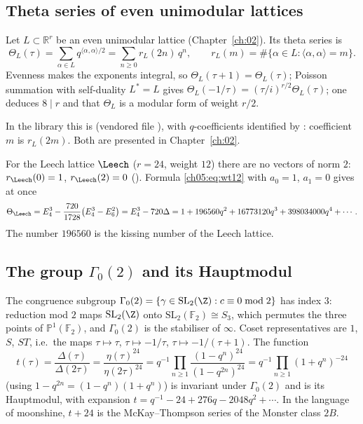 \subsection{Theta series of even unimodular lattices}\label{ch05:sec:thetabg}

Let $L\subset\mathbb R^r$ be an even unimodular lattice (Chapter~\ref{ch:02}). Its theta series is
\begin{equation*}
  \Theta_L(\tau) = \sum_{\alpha\in L} q^{\langle\alpha,\alpha\rangle/2}
  = \sum_{n\ge0} r_L(2n)\,q^n, \qquad r_L(m) = \#\{\alpha\in L : \langle\alpha,\alpha\rangle = m\}.
\end{equation*}
Evenness makes the exponents integral, so $\Theta_L(\tau+1) = \Theta_L(\tau)$; Poisson summation with
self-duality $L^* = L$ gives $\Theta_L(-1/\tau) = (\tau/i)^{r/2}\Theta_L(\tau)$; one deduces $8\mid r$
and that $\Theta_L$ is a modular form of weight $r/2$.
\begin{sloppypar}\noindent In the library this is
 (vendored file
), with $q$-coefficients identified by
: coefficient $m$ is $r_L(2m)$. Both are
presented in Chapter~\ref{ch:02}.\end{sloppypar}

For the Leech lattice $\Leech$ ($r = 24$, weight $12$) there are no vectors of norm $2$:
$r_\Leech(0) = 1$, $r_\Leech(2) = 0$ (). Formula \eqref{ch05:eq:wt12}
with $a_0 = 1$, $a_1 = 0$ gives at once
\begin{equation}\label{ch05:eq:leechtheta}
  \Theta_\Leech = E_4^3 - \frac{720}{1728}\bigl(E_4^3-E_6^2\bigr) = E_4^3 - 720\Delta
  = 1 + 196560q^2 + 16773120q^3 + 398034000q^4+\cdots.
\end{equation}
The number $196560$ is the kissing number of the Leech lattice.

\subsection{The group \texorpdfstring{$\Gamma_0(2)$}{Gamma0(2)} and its Hauptmodul}\label{ch05:sec:gamma02}

The congruence subgroup
$\Gamma_0(2) = \{\gamma\in\chfiveSL : c\equiv 0 \bmod 2\}$ has index $3$: reduction mod $2$ maps
$\chfiveSL$ onto $\mathrm{SL}_2(\mathbb F_2)\cong S_3$, which permutes the three points of
$\mathbb P^1(\mathbb F_2)$, and $\Gamma_0(2)$ is the stabiliser of $\infty$. Coset representatives are
$1$, $S$, $ST$, i.e.\ the maps $\tau\mapsto\tau$, $\tau\mapsto -1/\tau$, $\tau\mapsto -1/(\tau+1)$. The function
\begin{equation}\label{ch05:eq:t}
  t(\tau) = \frac{\Delta(\tau)}{\Delta(2\tau)} = \frac{\eta(\tau)^{24}}{\eta(2\tau)^{24}}
  = q^{-1}\prod_{n\ge1}\frac{(1-q^n)^{24}}{(1-q^{2n})^{24}} = q^{-1}\prod_{n\ge1}(1+q^n)^{-24}
\end{equation}
(using $1-q^{2n} = (1-q^n)(1+q^n)$) is invariant under $\Gamma_0(2)$ and is its Hauptmodul, with
expansion $t = q^{-1} - 24 + 276q - 2048q^2 + \cdots$. In the language of moonshine, $t + 24$ is the
McKay--Thompson series of the Monster class $2B$.

